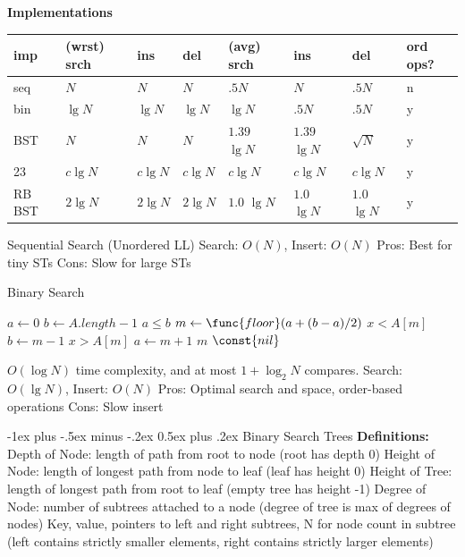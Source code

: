 \documentclass[letterpaper, 8pt]{extarticle}
\makeatletter
\renewcommand{\section}{\@startsection{section}{1}{0mm}%
                                {-1ex plus -.5ex minus -.2ex}%
                                {0.5ex plus .2ex}%
                                {\normalfont\normalsize\bfseries}}
\makeatother
\begin{document}
\begin{multicols*}{5}
  \textbf{Implementations}
  \begin{tabulary}{\linewidth}{@{}LLLLLLLL@{}} \toprule
    imp    & (wrst) srch & ins       & del       & (avg) srch     & ins            & del           & ord ops? \\ \midrule
    seq    & $N$         & $N$       & $N$       & $.5 N$         & $N$            & $.5 N$        & n        \\
    bin    & $\lg N$     & $\lg N$   & $\lg N$   & $\lg N$        & $.5 N$         & $.5 N$        & y        \\
    BST    & $N$         & $N$       & $N$       & $1.39$ $\lg N$ & $1.39$ $\lg N$ & $\sqrt N$     & y        \\
    23     & $c \lg N$   & $c \lg N$ & $c \lg N$ & $c \lg N$      & $c \lg N$      & $c \lg N$     & y        \\
    RB BST & $2 \lg N$   & $2 \lg N$ & $2 \lg N$ & $1.0$ $\lg N$  & $1.0$ $\lg N$  & $1.0$ $\lg N$ & y        \\
    \bottomrule
  \end{tabulary}

  Sequential Search (Unordered LL)
  Search: $O(N)$, Insert: $O(N)$
  Pros: Best for tiny STs
  Cons: Slow for large STs

  Binary Search
  \begin{codebox}
    \li $a \gets 0$ 
    \li $b \gets A.length - 1$ 
    \li \While $a \leq b$
    \li   \Do $m \gets \func{floor}(a + (b - a) / 2)$
    \li     \If $x < A[m]$
    \li       \Do $b \gets m - 1$
    \li     \ElseIf $x > A[m]$
    \li       \Do $a \gets m + 1$
    \li     \Else \Return $m$
    \End
    \End
    \li \Return $\const{nil}$
  \end{codebox}
  $O(\log N)$ time complexity, and at most $1 + \log_2 N$ compares.
  Search: $O(\lg N)$, Insert: $O(N)$
  Pros: Optimal search and space, order-based operations
  Cons: Slow insert

  \section{Binary Search Trees}
  \textbf{Definitions:}
  Depth of Node: length of path from root to node (root has depth 0)
  Height of Node: length of longest path from node to leaf (leaf has height 0)
  Height of Tree: length of longest path from root to leaf (empty tree has height -1)
  Degree of Node: number of subtrees attached to a node (degree of tree is max of degrees of nodes)
  Key, value, pointers to left and right subtrees, N for node count in subtree (left contains strictly smaller elements, right contains strictly larger elements)


\end{multicols*}
\end{document}
